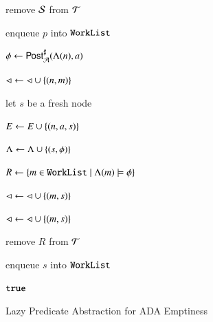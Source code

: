 \documentclass[10pt,conference,letterpaper,twocolumn]{IEEEtran}
\begin{document}
\begin{algorithm}[t!]
{\begin{algorithmic}[1]
  \State remove $\mathcal{S}$ from $\mathcal{T}$

  \State enqueue $p$ into $\mathtt{WorkList}$
  \label{ln:refine}

  \EndFor

  \EndIf

  \Else \label{ln:else}

  \label{ln:forall-events}

  \State $\phi \leftarrow {\mathsf{Post}}^\sharp_{\mathcal{A}}(\Lambda(n),a)$

   \label{ln:covered}

  \State $\lhd \leftarrow \lhd \cup \left\{ (n,m) \right\}$ 
  \label{ln:direct-cover}

  \Else 

  \State let $s$ be a fresh node

  \State $E \leftarrow E \cup \left\{ (n,a,s) \right\}$

  \State $\Lambda \leftarrow \Lambda \cup \left\{ (s,\phi) \right\}$

  \State $R \leftarrow \left\{ m \in \mathtt{WorkList} \mid \Lambda(m) \models
    \phi \right\}$ 

  

  \State $\lhd \leftarrow \lhd \cup \left\{ (m,s) \right\}$ 
  \label{ln:child-cover}

  \EndFor


  \State $\lhd \leftarrow \lhd \cup \left\{ (m,s) \right\}$ 
  \label{ln:indirect-cover}

  \EndFor

  \EndFor

  \State remove $R$ from $\mathcal{T}$

  \State enqueue $s$ into $\mathtt{WorkList}$ 
  \label{ln:expand}

  \EndIf

  \EndFor

  \EndIf

  \EndWhile

   $\mathtt{true}$
  \label{ln:true}
\end{algorithmic}}
\caption{Lazy Predicate Abstraction for ADA Emptiness}
\label{alg:predabs}
\end{algorithm}
\end{document}
